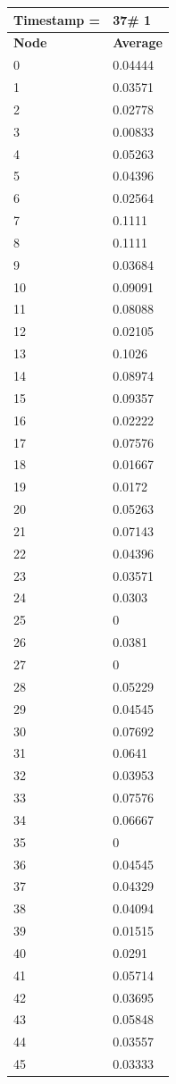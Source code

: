 \begin{tabular}{|l||l|}
\hline
\textbf{Timestamp =} & \textbf{37}\# 1\\\hline
	\textbf{Node} & \textbf{Average} \\ \hline
\hline
	0 & 0.04444 \\ \hline
	1 & 0.03571 \\ \hline
	2 & 0.02778 \\ \hline
	3 & 0.00833 \\ \hline
	4 & 0.05263 \\ \hline
	5 & 0.04396 \\ \hline
	6 & 0.02564 \\ \hline
	7 & 0.1111 \\ \hline
	8 & 0.1111 \\ \hline
	9 & 0.03684 \\ \hline
	10 & 0.09091 \\ \hline
	11 & 0.08088 \\ \hline
	12 & 0.02105 \\ \hline
	13 & 0.1026 \\ \hline
	14 & 0.08974 \\ \hline
	15 & 0.09357 \\ \hline
	16 & 0.02222 \\ \hline
	17 & 0.07576 \\ \hline
	18 & 0.01667 \\ \hline
	19 & 0.0172 \\ \hline
	20 & 0.05263 \\ \hline
	21 & 0.07143 \\ \hline
	22 & 0.04396 \\ \hline
	23 & 0.03571 \\ \hline
	24 & 0.0303 \\ \hline
	25 & 0 \\ \hline
	26 & 0.0381 \\ \hline
	27 & 0 \\ \hline
	28 & 0.05229 \\ \hline
	29 & 0.04545 \\ \hline
	30 & 0.07692 \\ \hline
	31 & 0.0641 \\ \hline
	32 & 0.03953 \\ \hline
	33 & 0.07576 \\ \hline
	34 & 0.06667 \\ \hline
	35 & 0 \\ \hline
	36 & 0.04545 \\ \hline
	37 & 0.04329 \\ \hline
	38 & 0.04094 \\ \hline
	39 & 0.01515 \\ \hline
	40 & 0.0291 \\ \hline
	41 & 0.05714 \\ \hline
	42 & 0.03695 \\ \hline
	43 & 0.05848 \\ \hline
	44 & 0.03557 \\ \hline
	45 & 0.03333 \\ \hline
\end{tabular}
